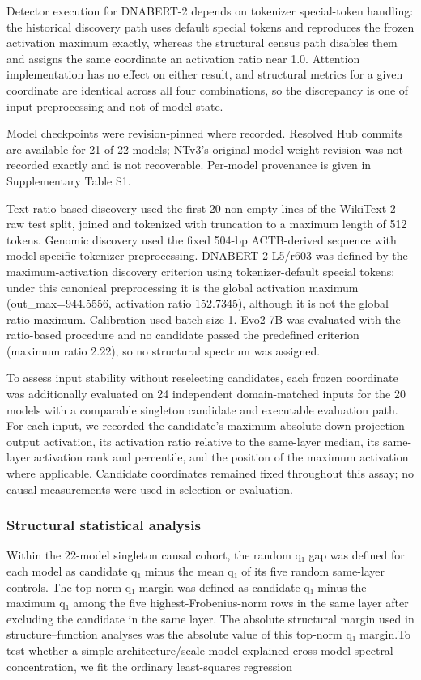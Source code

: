 \documentclass[11pt]{article}
\begin{document}
Detector execution for DNABERT-2 depends on tokenizer special-token handling: the historical discovery path uses default special tokens and reproduces the frozen activation maximum exactly, whereas the structural census path disables them and assigns the same coordinate an activation ratio near 1.0. Attention implementation has no effect on either result, and structural metrics for a given coordinate are identical across all four combinations, so the discrepancy is one of input preprocessing and not of model state.

Model checkpoints were revision-pinned where recorded. Resolved Hub commits are available for 21 of 22 models; NTv3’s original model-weight revision was not recorded exactly and is not recoverable. Per-model provenance is given in Supplementary Table S1.

Text ratio-based discovery used the first 20 non-empty lines of the WikiText-2 raw test split, joined and tokenized with truncation to a maximum length of 512 tokens. Genomic discovery used the fixed 504-bp ACTB-derived sequence with model-specific tokenizer preprocessing. DNABERT-2 L5/r603 was defined by the maximum-activation discovery criterion using tokenizer-default special tokens; under this canonical preprocessing it is the global activation maximum (out\_max=944.5556, activation ratio 152.7345), although it is not the global ratio maximum. Calibration used batch size 1. Evo2-7B was evaluated with the ratio-based procedure and no candidate passed the predefined criterion (maximum ratio 2.22), so no structural spectrum was assigned.

To assess input stability without reselecting candidates, each frozen coordinate was additionally evaluated on 24 independent domain-matched inputs for the 20 models with a comparable singleton candidate and executable evaluation path. For each input, we recorded the candidate’s maximum absolute down-projection output activation, its activation ratio relative to the same-layer median, its same-layer activation rank and percentile, and the position of the maximum activation where applicable. Candidate coordinates remained fixed throughout this assay; no causal measurements were used in selection or evaluation.

\subsubsection*{Structural statistical analysis}
Within the 22-model singleton causal cohort, the random q₁ gap was defined for each model as candidate q₁ minus the mean q₁ of its five random same-layer controls. The top-norm q₁ margin was defined as candidate q₁ minus the maximum q₁ among the five highest-Frobenius-norm rows in the same layer after excluding the candidate in the same layer. The absolute structural margin used in structure–function analyses was the absolute value of this top-norm q₁ margin.To test whether a simple architecture/scale model explained cross-model spectral concentration, we fit the ordinary least-squares regression
\end{document}
